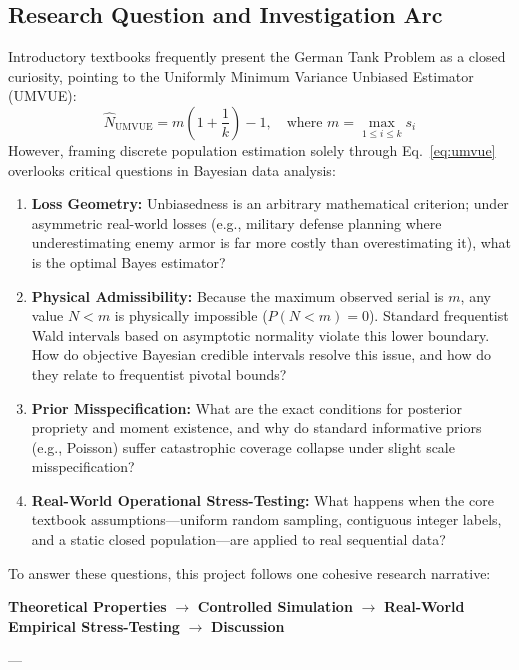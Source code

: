 \documentclass[10pt,a4paper]{article}
\begin{document}
\subsection{Research Question and Investigation Arc}
Introductory textbooks frequently present the German Tank Problem as a closed curiosity, pointing to the Uniformly Minimum Variance Unbiased Estimator (UMVUE):
\begin{equation}
\hat{N}_{\text{UMVUE}} = m \left(1 + \frac{1}{k}\right) - 1, \quad \text{where } m = \max_{1 \le i \le k} s_i
\label{eq:umvue}
\end{equation}
However, framing discrete population estimation solely through Eq.~\eqref{eq:umvue} overlooks critical questions in Bayesian data analysis:
\begin{enumerate}
    \item \textbf{Loss Geometry:} Unbiasedness is an arbitrary mathematical criterion; under asymmetric real-world losses (e.g., military defense planning where underestimating enemy armor is far more costly than overestimating it), what is the optimal Bayes estimator?
    \item \textbf{Physical Admissibility:} Because the maximum observed serial is $m$, any value $N < m$ is physically impossible ($P(N < m) = 0$). Standard frequentist Wald intervals based on asymptotic normality violate this lower boundary. How do objective Bayesian credible intervals resolve this issue, and how do they relate to frequentist pivotal bounds?
    \item \textbf{Prior Misspecification:} What are the exact conditions for posterior propriety and moment existence, and why do standard informative priors (e.g., Poisson) suffer catastrophic coverage collapse under slight scale misspecification?
    \item \textbf{Real-World Operational Stress-Testing:} What happens when the core textbook assumptions---uniform random sampling, contiguous integer labels, and a static closed population---are applied to real sequential data?
\end{enumerate}

To answer these questions, this project follows one cohesive research narrative:
\begin{center}
\textbf{Theoretical Properties} $\longrightarrow$ \textbf{Controlled Simulation} $\longrightarrow$ \textbf{Real-World Empirical Stress-Testing} $\longrightarrow$ \textbf{Discussion}
\end{center}

---
\end{document}
